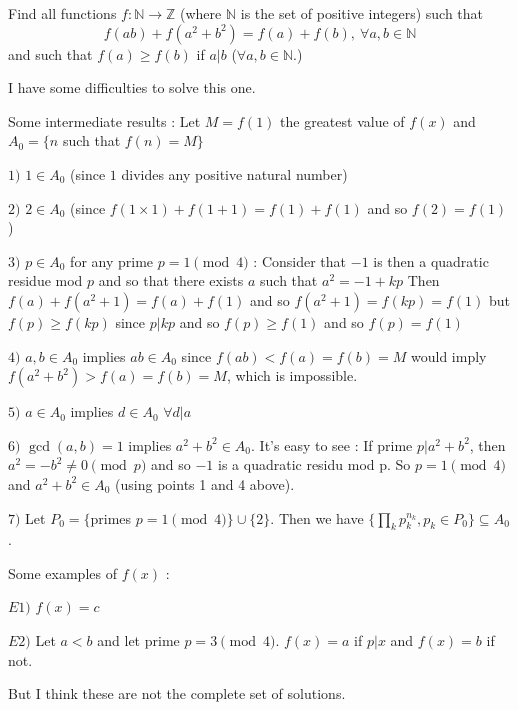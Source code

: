 \begin{mysolution}
	\begin{tcolorbox}Find all functions $ f: \mathbb{N} \rightarrow \mathbb{Z}$ (where $ \mathbb{N}$ is the set of positive integers) such that
\[ f(ab) + f\left(a^2 + b^2\right) = f(a) + f(b),\ \forall a, b \in \mathbb{N}
\]
and such that $ f(a) \geq f(b)$ if $ a | b$ ($ \forall a, b \in \mathbb{N}$.)\end{tcolorbox}

I have some difficulties to solve this one.

Some intermediate results :
Let $ M=f(1)$ the greatest value of $ f(x)$ and $ A_0=\{n$ such that $ f(n)=M\}$

$ 1)$ $ 1\in A_0$ (since $ 1$ divides any positive natural number)

$ 2)$ $ 2\in A_0$ (since $ f(1\times 1)+f(1+1)=f(1)+f(1)$ and so $ f(2)=f(1)$)

$ 3)$ $ p\in A_0$ for any prime $ p=1\pmod{4}$ : Consider that $ -1$ is then a quadratic residue mod $ p$ and so that there exists $ a$ such that $ a^2=-1+kp$
Then $ f(a)+f(a^2+1)=f(a)+f(1)$ and so $ f(a^2+1)=f(kp)=f(1)$ but $ f(p)\geq f(kp)$ since $ p|kp$ and so $ f(p)\geq f(1)$ and so $ f(p)=f(1)$

$ 4)$ $ a,b\in A_0$ implies $ ab\in A_0$ since $ f(ab)<f(a)=f(b)=M$ would imply $ f(a^2+b^2)>f(a)=f(b)=M$, which is impossible.

$ 5)$ $ a\in A_0$ implies $ d\in A_0$ $ \forall d|a$

$ 6)$ $ \gcd(a,b)=1$ implies $ a^2+b^2\in A_0$. It's easy to see : If prime $ p|a^2+b^2$, then $ a^2=-b^2\neq 0\pmod{p}$ and so $ -1$ is a quadratic residu mod p. So $ p=1\pmod{4}$ and $ a^2+b^2\in A_0$ (using points 1 and 4 above).

$ 7)$ Let $ P_0=\{$primes $ p=1\pmod{4}\}\cup\{2\}$. Then we have $ \{\prod_kp_k^{n_k},p_k\in P_0\}\subseteq A_0$.


Some examples of $ f(x)$ :

$ E1)$ $ f(x)=c$

$ E2)$ Let $ a<b$ and let prime $ p=3\pmod{4}$. 
$ f(x)=a$ if $ p|x$ and $ f(x)=b$ if not.

But I think these are not the complete set of solutions.
\end{mysolution}




